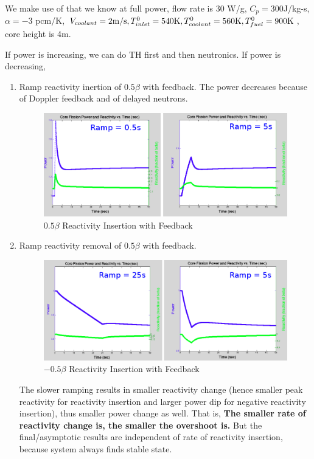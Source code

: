 \documentclass{school-22.211-notes}
\begin{document}
We make use of that we know at full power,  flow rate is 30 W/g, $C_p = 300$J/kg-s, $\alpha = -3$ pcm/K, $V_{coolant} = 2 \mathrm{m}/\mathrm{s}, T_{inlet}^0 = 540 \mathrm{K}, T_{coolant}^0 = 560 \mathrm{K}, T_{fuel}^0 = 900 \mathrm{K}$, core height is 4m. 


If power is increasing, we can do TH first and then neutronics. If power is decreasing, 




\clearpage
{}
\begin{enumerate}
\item Ramp reactivity inertion of $0.5\beta$ with feedback. The power decreases because of Doppler feedback and of delayed neutrons. 

\begin{figure}[ht]
  \centering
  \includegraphics[width=6in]{images/pke/fn5.png}
  \caption{$0.5 \beta$ Reactivity Insertion with Feedback}
\end{figure}

\item Ramp reactivity removal of $0.5\beta$ with feedback. 
\begin{figure}[ht]
  \centering
  \includegraphics[width=6in]{images/pke/fn6.png}
  \caption{$-0.5 \beta$ Reactivity Insertion with Feedback}
\end{figure}
The slower ramping results in smaller reactivity change (hence smaller peak reactivity for reactivity insertion and larger power dip for negative reactivity insertion), thus smaller power change as well. That is, \textbf{The smaller rate of reactivity change is, the smaller the overshoot is.} But the final/asymptotic results are independent of rate of reactivity insertion, because system always finds stable state. 


\end{enumerate}
\end{document}
